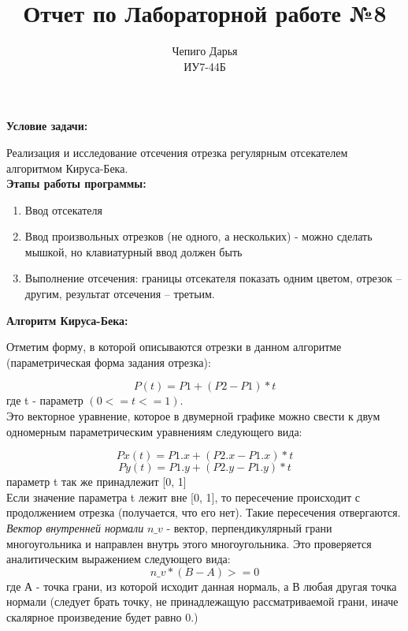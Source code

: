 \documentclass[a4paper,12pt]{article}
\title{Отчет по Лабораторной работе №8\\[150mm]}
\author{Чепиго Дарья \\ИУ7-44Б}
\date{}
\begin{document}
	\begin{titlepage}
		\maketitle
		\thispagestyle{empty}
	\end{titlepage}
	
	\newpage
	\noindent\textbf{Условие задачи:}

	Реализация и исследование отсечения отрезка регулярным отсекателем алгоритмом Кируса-Бека.\\
	
	\noindent\textbf{Этапы работы программы:}
	\begin{enumerate} 
		\item Ввод отсекателя
		\item Ввод произвольных отрезков (не одного, а нескольких) - можно сделать мышкой, но клавиатурный ввод должен быть
		\item Выполнение отсечения: границы отсекателя показать одним цветом, отрезок -- другим, результат отсечения -- третьим.
	\end{enumerate}
	
	\noindent\textbf{Алгоритм Кируса-Бека:}
	
	Отметим форму, в которой описываются отрезки в данном алгоритме (параметрическая форма задания отрезка):
	
	\[P(t) = P1 + (P2  - P1) * t\]
	где t - параметр $(0 <= t <= 1)$.\\
	
	Это векторное уравнение, которое в двумерной графике можно свести к двум одномерным параметрическим уравнениям следующего вида:
	
	\[Px(t) = P1.x + (P2.x  - P1.x) * t\]
	\[Py(t) = P1.y+ (P2.y  - P1.y) * t\]
	параметр t так же принадлежит [0, 1]\\
	
	Если значение параметра t лежит вне [0, 1], то пересечение происходит с продолжением отрезка (получается, что его нет). Такие пересечения отвергаются.\\
	
	\textit{Вектор внутренней нормали} $n\_v$ - вектор, перпендикулярный грани многоугольника и направлен внутрь этого многоугольника. Это проверяется аналитическим выражением следующего вида: \[n\_v * (B - A) >= 0\]
	где А - точка грани, из которой исходит данная нормаль, а В любая другая точка нормали (следует брать точку, не принадлежащую рассматриваемой грани, иначе скалярное произведение будет равно 0.)\\
	
\end{document}
